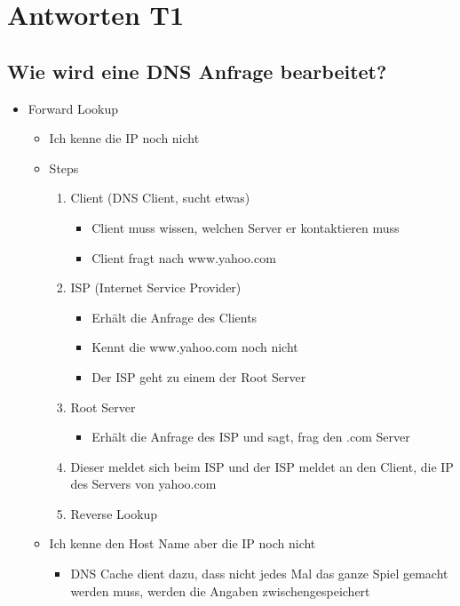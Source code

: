 \section{Antworten T1}
\subsection*{Wie wird eine DNS Anfrage bearbeitet?}
\begin{itemize}
    \item Forward Lookup
    \begin{itemize}
        \item Ich kenne die IP noch nicht
        \item Steps
        \begin{enumerate}
            \item Client (DNS Client, sucht etwas)
            \begin{itemize}
                \item Client muss wissen, welchen Server er kontaktieren muss
                \item Client fragt nach www.yahoo.com
            \end{itemize}
            \item ISP (Internet Service Provider)
            \begin{itemize}
                \item Erhält die Anfrage des Clients
                \item Kennt die www.yahoo.com noch nicht
                \item Der ISP geht zu einem der Root Server
            \end{itemize}
            \item Root Server
            \begin{itemize}
                \item Erhält die Anfrage des ISP und sagt, frag den .com Server
            \end{itemize}
            \item Dieser meldet sich beim ISP und der ISP meldet an den Client, die IP des Servers von yahoo.com
            \item Reverse Lookup
        \end{enumerate}
        \item Ich kenne den Host Name aber die IP noch nicht
        \begin{itemize}
            \item DNS Cache dient dazu, dass nicht jedes Mal das ganze Spiel gemacht werden muss, werden die Angaben zwischengespeichert
        \end{itemize}
    \end{itemize}
\end{itemize}


